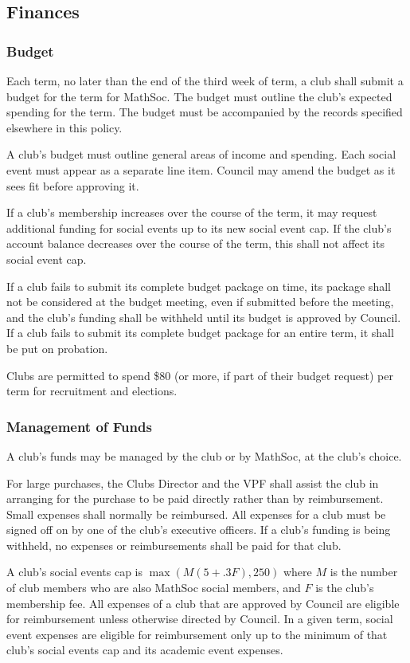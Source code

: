 \subsection{Finances}
\subsubsection{Budget}
Each term, no later than the end of the third week of term, a club shall submit
a budget for the term for MathSoc. The budget must outline the club's expected
spending for the term. The budget must be accompanied by the records specified
elsewhere in this policy.

A club's budget must outline general areas of income and spending. Each social
event must appear as a separate line item. Council may amend the budget as it
sees fit before approving it.

If a club's membership increases over the course of the term, it may request
additional funding for social events up to its new social event cap. If the
club's account balance decreases over the course of the term, this shall not
affect its social event cap.

If a club fails to submit its complete budget package on time, its package shall
not be considered at the budget meeting, even if submitted before the meeting,
and the club's funding shall be withheld until its budget is approved by
Council. If a club fails to submit its complete budget package for an entire
term, it shall be put on probation.

Clubs are permitted to spend \$80 (or more, if part of their budget request) per
term for recruitment and elections.

\subsubsection{Management of Funds}
A club's funds may be managed by the club or by MathSoc, at the club's choice.

For large purchases, the Clubs Director and the VPF shall assist the club in
arranging for the purchase to be paid directly rather than by reimbursement.
Small expenses shall normally be reimbursed.  All expenses for a club must be
signed off on by one of the club's executive officers. If a club's funding is
being withheld, no expenses or reimbursements shall be paid for that club.

A club's social events cap is $\max(M(5 + .3F), 250)$ where $M$ is the
number of club members who are also MathSoc social members, and $F$ is the
club's membership fee. All expenses of a club that are approved by Council are
eligible for reimbursement unless otherwise directed by Council. In a given
term, social event expenses are eligible for reimbursement only up to the
minimum of that club's social events cap and its academic event expenses.

